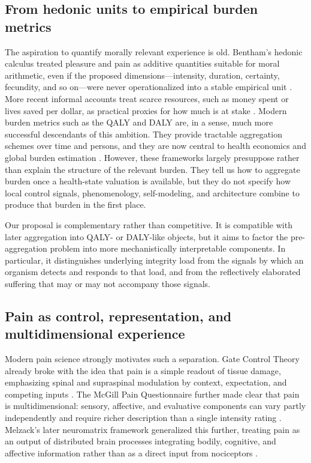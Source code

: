 \documentclass[11pt]{article}
\begin{document}
\subsection{From hedonic units to empirical burden metrics}

The aspiration to quantify morally relevant experience is old. Bentham’s hedonic calculus treated pleasure and pain as additive quantities suitable for moral arithmetic, even if the proposed dimensions---intensity, duration, certainty, fecundity, and so on---were never operationalized into a stable empirical unit \cite{bentham1789principles}. More recent informal accounts treat scarce resources, such as money spent or lives saved per dollar, as practical proxies for how much is at stake \cite{yudkowsky2009money}. Modern burden metrics such as the QALY and DALY are, in a sense, much more successful descendants of this ambition. They provide tractable aggregation schemes over time and persons, and they are now central to health economics and global burden estimation \cite{whitehead2010qaly,murray1996globalburden,murray2013gbd,who_daly}. However, these frameworks largely presuppose rather than explain the structure of the relevant burden. They tell us how to aggregate burden once a health-state valuation is available, but they do not specify how local control signals, phenomenology, self-modeling, and architecture combine to produce that burden in the first place.

Our proposal is complementary rather than competitive. It is compatible with later aggregation into QALY- or DALY-like objects, but it aims to factor the pre-aggregation problem into more mechanistically interpretable components. In particular, it distinguishes underlying integrity load from the signals by which an organism detects and responds to that load, and from the reflectively elaborated suffering that may or may not accompany those signals.

\subsection{Pain as control, representation, and multidimensional experience}

Modern pain science strongly motivates such a separation. Gate Control Theory already broke with the idea that pain is a simple readout of tissue damage, emphasizing spinal and supraspinal modulation by context, expectation, and competing inputs \cite{melzack1965gate}. The McGill Pain Questionnaire further made clear that pain is multidimensional: sensory, affective, and evaluative components can vary partly independently and require richer description than a single intensity rating \cite{melzack1975mpq}. Melzack’s later neuromatrix framework generalized this further, treating pain as an output of distributed brain processes integrating bodily, cognitive, and affective information rather than as a direct input from nociceptors \cite{melzack2001neuromatrix,wall1999pain}.
\end{document}

